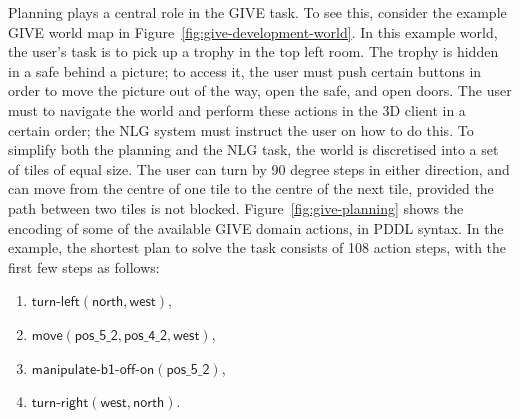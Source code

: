 Planning plays a central role in the GIVE task. To see this, consider
the example GIVE world map in
Figure~\ref{fig:give-development-world}. In this example world, the
user's task is to pick up a trophy in the top left room. The trophy is
hidden in a safe behind a picture; to access it, the user must push
certain buttons in order to move the picture out of the way, open the
safe, and open doors. The user must to navigate the world and perform
these actions in the 3D client in a certain order; the NLG system must
instruct the user on how to do this.  To simplify both the planning
and the NLG task, the world is discretised into a set of tiles of
equal size. The user can turn by 90 degree steps in either direction,
and can move from the centre of one tile to the centre of the next
tile, provided the path between two tiles is not blocked.
Figure~\ref{fig:give-planning} shows the encoding of some of the
available GIVE domain actions, in PDDL syntax. In the example, the
shortest plan to solve the task consists of 108 action steps, with the
first few steps as follows:
%
\begin{enumerate}
\item $\mathsf{turn}\textsf{-}\mathsf{left}(\mathsf{north},
\mathsf{west})$,
\item $\mathsf{move}(\mathsf{pos\_5\_2}, \mathsf{pos\_4\_2}, \mathsf{west})$,
\item $\mathsf{manipulate}\textsf{-}\mathsf{b1}\textsf{-}\mathsf{off}\textsf{-}\mathsf{on}(\mathsf{pos\_5\_2})$,
\item $\mathsf{turn}\textsf{-}\mathsf{right}(\mathsf{west}, \mathsf{north})$.
\end{enumerate}

